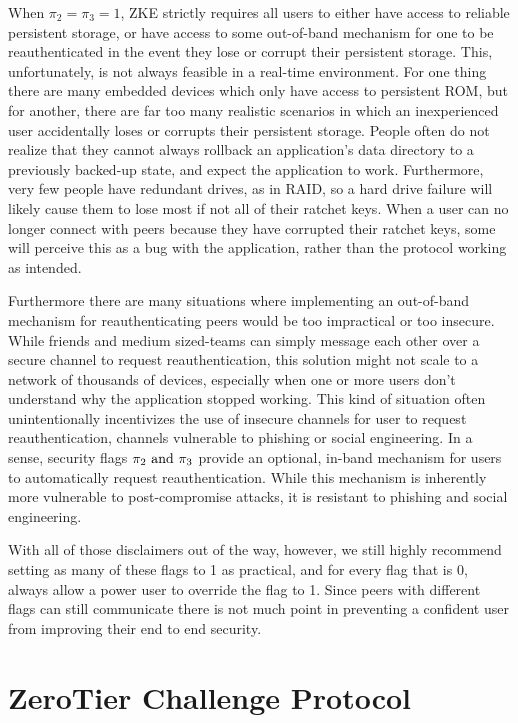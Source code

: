 \documentclass{article}
\begin{document}
When $\pi_2 = \pi_3 = 1$, ZKE strictly requires all users to either have access to reliable persistent storage, or have access to some out-of-band mechanism for one to be reauthenticated in the event they lose or corrupt their persistent storage. This, unfortunately, is not always feasible in a real-time environment. For one thing there are many embedded devices which only have access to persistent ROM, but for another, there are far too many realistic scenarios in which an inexperienced user accidentally loses or corrupts their persistent storage. People often do not realize that they cannot always rollback an application's data directory to a previously backed-up state, and expect the application to work. Furthermore, very few people have redundant drives, as in RAID, so a hard drive failure will likely cause them to lose most if not all of their ratchet keys. When a user can no longer connect with peers because they have corrupted their ratchet keys, some will perceive this as a bug with the application, rather than the protocol working as intended.

Furthermore there are many situations where implementing an out-of-band mechanism for reauthenticating peers would be too impractical or too insecure. While friends and medium sized-teams can simply message each other over a secure channel to request reauthentication, this solution might not scale to a network of thousands of devices, especially when one or more users don't understand why the application stopped working. This kind of situation often unintentionally incentivizes the use of insecure channels for user to request reauthentication, channels vulnerable to phishing or social engineering. In a sense, security flags $\pi_2 \text{ and } \pi_3$ provide an optional, in-band mechanism for users to automatically request reauthentication. While this mechanism is inherently more vulnerable to post-compromise attacks, it is resistant to phishing and social engineering.

With all of those disclaimers out of the way, however, we still highly recommend setting as many of these flags to 1 as practical, and for every flag that is 0, always allow a power user to override the flag to 1. Since peers with different flags can still communicate there is not much point in preventing a confident user from improving their end to end security.

\section{ZeroTier Challenge Protocol}
\end{document}
